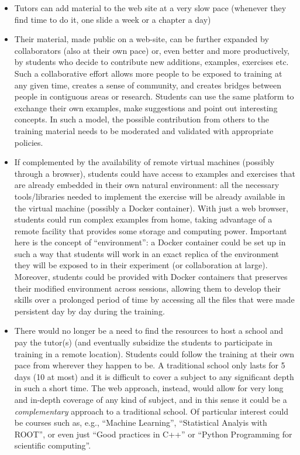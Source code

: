 \begin{itemize}[itemsep=0pt,parsep=0pt,topsep=5pt,partopsep=0pt]
   \item Tutors can add material to the web site at a very slow pace (whenever they find time to do it, one slide a week or a chapter a day)
   \item Their material, made public on a web-site, can be further expanded by collaborators (also at their own pace) or, even better and more productively, by students who decide to contribute new additions, examples, exercises etc. Such a collaborative effort allows more people to be exposed to training at any given time, creates a sense of community, and creates bridges between people in contiguous areas or research. Students can use the same platform to exchange their own examples, make suggestions and point out interesting concepts. In such a model, the possible contribution from others to the training material needs to be moderated and validated with appropriate policies.
   \item If complemented by the availability of remote virtual machines (possibly through a browser), students could have access to examples and exercises that are already embedded in their own natural environment: all the necessary tools/libraries needed to implement the exercise will be already available in the virtual machine (possibly a Docker container). With just a web browser, students could run complex examples from home, taking advantage of a remote facility that provides some storage and computing power. Important here is the concept of ``environment'': a Docker container could be set up in such a way that students will work in an exact replica of the environment they will be exposed to in their experiment (or collaboration at large). Moreover, students could be provided with Docker containers that preserves their modified environment across sessions, allowing them to develop their skills over a prolonged period of time by accessing all the files that were made persistent day by day during the training.
   \item There would no longer be a need to find the resources to host a school and pay the tutor(s) (and eventually subsidize the students to participate in training in a remote location). Students could follow the training at their own pace from wherever they happen to be. A traditional school only lasts for 5 days (10 at most) and it is difficult to cover a  subject to any significant depth in such a short time. The web approach, instead, would allow for very long and in-depth coverage of any kind of subject, and in this sense it could be a {\it complementary} approach to a traditional school. Of particular interest could be courses such as, e.g., ``Machine Learning'', ``Statistical Analyis with ROOT'', or even just ``Good practices in C++'' or ``Python Programming for scientific computing''. 

\end{itemize}
